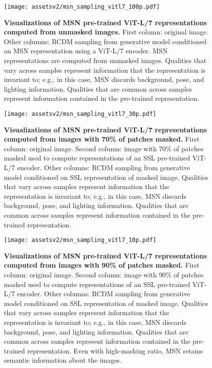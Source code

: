\documentclass{article}
\begin{document}
\begin{figure}[t]
    \centering
    \texttt{[image: assetsv2/msn\_sampling\_vitl7\_100p.pdf]}
    \caption{{\bf Visualizations of MSN pre-trained ViT-L/7 representations computed from unmasked images.} First column: original image. Other columns: RCDM sampling from generative model conditioned on MSN representation using a ViT-L/7 encoder. MSN representations are computed from unmasked images. Qualities that vary across samples represent information that the representation is invariant to; e.g., in this case, MSN discards background, pose, and lighting information. Qualities that are common across samples represent information contained in the pre-trained representation.}
    \label{fig:qualitiative_vitl7_100percent}
\end{figure}

\begin{figure}[t]
    \centering
    \texttt{[image: assetsv2/msn\_sampling\_vitl7\_30p.pdf]}
    \caption{{\bf Visualizations of MSN pre-trained ViT-L/7 representations computed from images with 70\% of patches masked.} First column: original image. Second column: image with 70\% of patches masked used to compute representations of an SSL pre-trained ViT-L/7 encoder. Other columns: RCDM sampling from generative model conditioned on SSL representation of masked image. Qualities that vary across samples represent information that the representation is invariant to; e.g., in this case, MSN discards background, pose, and lighting information. Qualities that are common across samples represent information contained in the pre-trained representation.}
    \label{fig:qualitiative_vitl7_30percent}
\end{figure}

\begin{figure}[t]
    \centering
    \texttt{[image: assetsv2/msn\_sampling\_vitl7\_10p.pdf]}
    \caption{{\bf Visualizations of MSN pre-trained ViT-L/7 representations computed from images with 90\% of patches masked.} First column: original image. Second column: image with 90\% of patches masked used to compute representations of an SSL pre-trained ViT-L/7 encoder. Other columns: RCDM sampling from generative model conditioned on SSL representation of masked image. Qualities that vary across samples represent information that the representation is invariant to; e.g., in this case, MSN discards background, pose, and lighting information. Qualities that are common across samples represent information contained in the pre-trained representation. Even with high-masking ratio, MSN retains semantic information about the images.}
    \label{fig:qualitiative_vitl7_10percent}
\end{figure}
\end{document}
